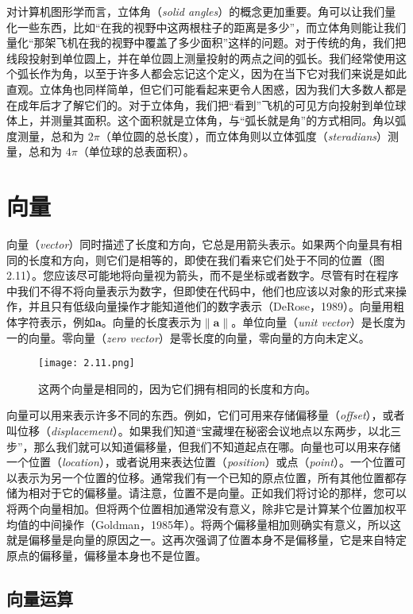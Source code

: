 \documentclass[lang=cn,12pt]{elegantbook}
\begin{document}
对计算机图形学而言，立体角（\textit{solid angles}）的概念更加重要。角可以让我们量化一些东西，比如“在我的视野中这两根柱子的距离是多少”，而立体角则能让我们量化“那架飞机在我的视野中覆盖了多少面积”这样的问题。对于传统的角，我们把线段投射到单位圆上，并在单位圆上测量投射的两点之间的弧长。我们经常使用这个弧长作为角，以至于许多人都会忘记这个定义，因为在当下它对我们来说是如此直观。立体角也同样简单，但它们可能看起来更令人困惑，因为我们大多数人都是在成年后才了解它们的。对于立体角，我们把“看到”飞机的可见方向投射到单位球体上，并测量其面积。这个面积就是立体角，与“弧长就是角”的方式相同。角以弧度测量，总和为 $2\pi$（单位圆的总长度），而立体角则以立体弧度（\textit{steradians}）测量，总和为 $4\pi$（单位球的总表面积）。

\section{向量}
向量（\textit{vector}）同时描述了长度和方向，它总是用箭头表示。如果两个向量具有相同的长度和方向，则它们是相等的，即使在我们看来它们处于不同的位置（图 2.11）。您应该尽可能地将向量视为箭头，而不是坐标或者数字。尽管有时在程序中我们不得不将向量表示为数字，但即使在代码中，他们也应该以对象的形式来操作，并且只有低级向量操作才能知道他们的数字表示（DeRose，1989）。向量用粗体字符表示，例如\textbf{a}。向量的长度表示为$\|\mathbf{a}\|$。单位向量（\textit{unit vector}）是长度为一的向量。零向量（\textit{zero vector}）是零长度的向量，零向量的方向未定义。

\begin{figure}[htbp]
  \centering
  \texttt{[image: 2.11.png]}
  \caption{这两个向量是相同的，因为它们拥有相同的长度和方向。}
\end{figure}

向量可以用来表示许多不同的东西。例如，它们可用来存储偏移量（\textit{offset}），或者叫位移（\textit{displacement}）。如果我们知道“宝藏埋在秘密会议地点以东两步，以北三步”，那么我们就可以知道偏移量，但我们不知道起点在哪。向量也可以用来存储一个位置（\textit{location}），或者说用来表达位置（\textit{position}）或点（\textit{point}）。一个位置可以表示为另一个位置的位移。通常我们有一个已知的原点位置，所有其他位置都存储为相对于它的偏移量。请注意，位置不是向量。正如我们将讨论的那样，您可以将两个向量相加。但将两个位置相加通常没有意义，除非它是计算某个位置加权平均值的中间操作（Goldman，1985年）。将两个偏移量相加则确实有意义，所以这就是偏移量是向量的原因之一。这再次强调了位置本身不是偏移量，它是来自特定原点的偏移量，偏移量本身也不是位置。

\subsection{向量运算}
\end{document}
